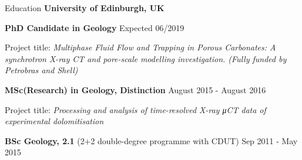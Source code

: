 \documentclass{resume} %
\newenvironment{indentpar}[1]%
  {\begin{list}{}%
          {\setlength{\leftmargin}{#1}}%
          \item[]%
  }
  {\end{list}}
\begin{document}
\begin{rSection}{Education}
{\bf University of Edinburgh, UK} 
\begin{indentpar}{0.5cm}

\textbf{    PhD Candidate in Geology} \hfill {Expected 06/2019}
\begin{indentpar}{0.5cm}
Project title: \textit{Multiphase Fluid Flow and Trapping in Porous Carbonates: A synchrotron X-ray CT and pore-scale modelling investigation. (Fully funded by Petrobras and Shell)}
\end{indentpar}
\textbf{    MSc(Research) in Geology, Distinction} \hfill {August 2015 - August 2016} 
\begin{indentpar}{0.5cm}
Project title: \textit {Processing and analysis of time-resolved X-ray μCT data of experimental dolomitisation}
\end{indentpar}
\textbf{    BSc Geology, 2.1} (2+2 double-degree programme with CDUT) \hfill {Sep 2011 - May 2015} 
\end{indentpar}
\end{rSection}
\end{document}
